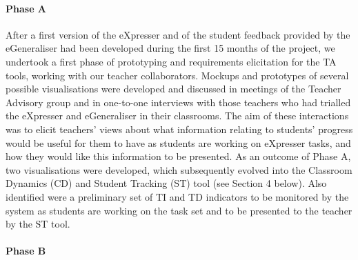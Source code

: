 \paragraph{Phase A}
\label{sec:phase}

After a first version of the eXpresser and of the student feedback
provided by the eGeneraliser had been developed during the first 15
months of the project, we undertook a first phase of prototyping and
requirements elicitation for the TA tools, working with our teacher
collaborators.    %
Mockups and
prototypes of several possible visualisations were developed and
discussed in meetings of the Teacher Advisory group and in one-to-one
interviews with those teachers who had trialled the eXpresser and
eGeneraliser in their classrooms. The aim of these interactions was to
elicit teachers' views about what information relating to students'
progress would be useful for them to have as
students are working on eXpresser tasks, and how they would like this
information to be presented.  
As an outcome of Phase A, two visualisations were developed, 
which subsequently evolved into the Classroom Dynamics
(CD) and Student Tracking (ST) tool (see Section 4 below). 
Also identified were a preliminary set of TI and TD indicators
to be monitored by the system as students are working on the task
set and to be presented to the teacher by the ST tool.

\paragraph{Phase B}
\label{sec:phase-b}

